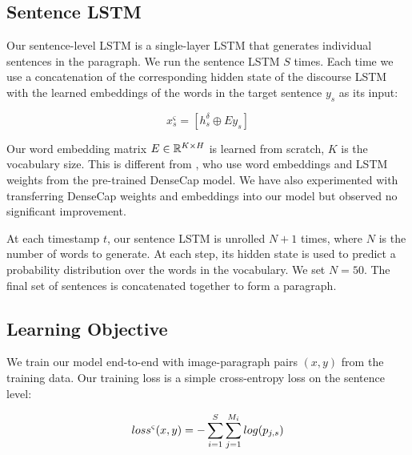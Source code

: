 \documentclass[11pt,a4paper]{article}
\newcommand{\R}{\mathbb{R}}
\begin{document}
\subsection{Sentence LSTM}
Our sentence-level LSTM is a single-layer LSTM that generates individual sentences in the paragraph.
We run the sentence LSTM $S$ times. Each time we use a concatenation of the corresponding hidden state of the discourse LSTM with the learned embeddings of the words in the target sentence $y_s$ as its input:

\begin{equation}
 x^\varsigma_s = [h^\delta_s \oplus Ey_s ]
\end{equation}


Our word embedding matrix $E \in \R\sp{K \times H}$ is learned from scratch, $K$ is the vocabulary size.
This is different from \cite{krause2016hierarchical}, who use word embeddings and LSTM weights from the pre-trained DenseCap model. %
We have also experimented with transferring DenseCap weights and embeddings into our model but observed no significant improvement.

At each timestamp $t$, our sentence LSTM is unrolled $N+1$ times, where $N$ is the number of words to generate. At each step, its hidden state is used to predict a probability distribution over the words in the vocabulary. We set $N=50$.
The final set of sentences is concatenated together to form a paragraph.


\subsection{Learning Objective}
We train our model end-to-end with image-paragraph pairs $(x, y)$ from the training data.
Our training loss is a simple cross-entropy loss on the sentence level:

\begin{equation}
 loss\sp{\varsigma}(x, y) = - \sum_{i=1}^{S}\sum_{j=1}^{M_i} log(p_{j,s})
\end{equation}
\end{document}
